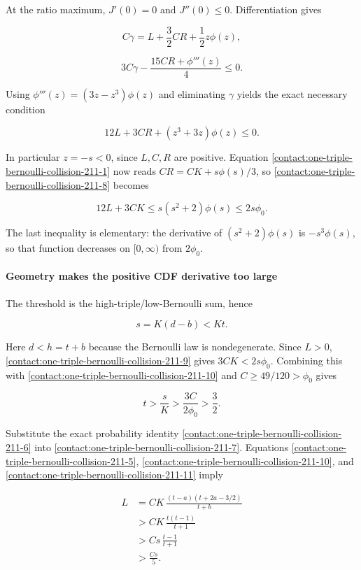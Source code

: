 At the ratio maximum, $J'(0)=0$ and $J''(0)\le 0$. Differentiation gives

\[
 C\gamma=L+\frac32CR+\frac12z\phi(z),
\]

\[
 3C\gamma-\frac{15CR+\phi'''(z)}4\leq0.
\]

Using $\phi'''(z)=(3z-z^3)\phi(z)$ and eliminating $\gamma$ yields the exact
necessary condition

\[
 \boxed{\quad 12L+3CR+(z^3+3z)\phi(z)\leq0.\quad}
\tag{B.14.8}\label{contact:one-triple-bernoulli-collision-211-8}
\]

In particular $z=-s<0$, since $L,C,R$ are positive. Equation \eqref{contact:one-triple-bernoulli-collision-211-1} now
reads $CR=CK+s \phi(s)/3$, so \eqref{contact:one-triple-bernoulli-collision-211-8} becomes

\[
 12L+3CK\leq s(s^2+2)\phi(s)\leq2s\phi_0.
\tag{B.14.9}\label{contact:one-triple-bernoulli-collision-211-9}
\]

The last inequality is elementary: the derivative of
$(s^2+2)\phi(s)$ is $-s^3 \phi(s)$, so that function decreases on
$[0,\infty)$ from $2\phi_0$.

\paragraph{Geometry makes the positive CDF derivative too large}

The threshold is the high-triple/low-Bernoulli sum, hence

\[
 s=K(d-b)<Kt.
\tag{B.14.10}\label{contact:one-triple-bernoulli-collision-211-10}
\]

Here $d<h=t+b$ because the Bernoulli law is nondegenerate. Since $L>0$,
\eqref{contact:one-triple-bernoulli-collision-211-9} gives $3CK<2s \phi_0$. Combining this with \eqref{contact:one-triple-bernoulli-collision-211-10} and
$C\ge49/120>\phi_0$ gives

\[
 \boxed{\quad t>\frac sK>\frac{3C}{2\phi_0}>\frac32.\quad}
\tag{B.14.11}\label{contact:one-triple-bernoulli-collision-211-11}
\]

Substitute the exact probability identity \eqref{contact:one-triple-bernoulli-collision-211-6} into \eqref{contact:one-triple-bernoulli-collision-211-7}. Equations
\eqref{contact:one-triple-bernoulli-collision-211-5}, \eqref{contact:one-triple-bernoulli-collision-211-10}, and \eqref{contact:one-triple-bernoulli-collision-211-11} imply

\[
 \begin{aligned}
 L
 &=CK\,\frac{(t-a)(t+2a-3/2)}{t+b}\\
 &>CK\,\frac{t(t-1)}{t+1}\\
 &>Cs\,\frac{t-1}{t+1}\\
 &>\frac{Cs}{5}.
 \end{aligned}
\tag{B.14.12}\label{contact:one-triple-bernoulli-collision-211-12}
\]

